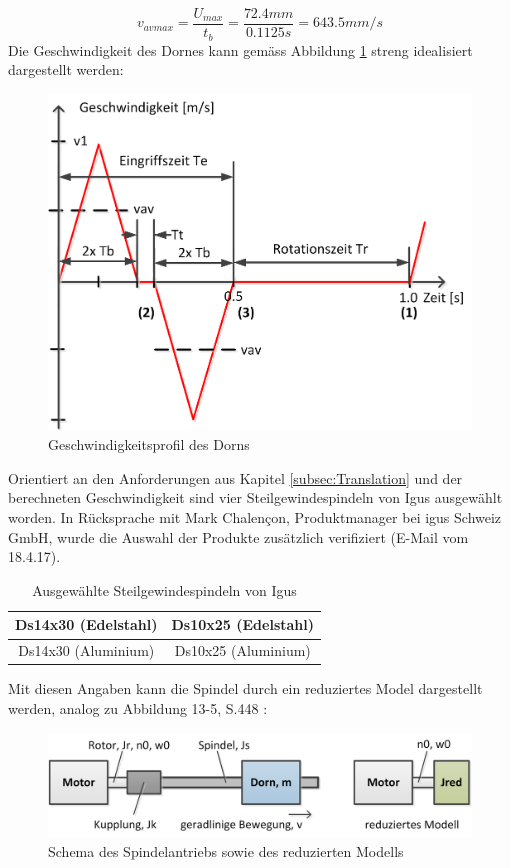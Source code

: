 \begin{equation}
v_{avmax}=\frac{U_{max}}{t_{b}}=\frac{72.4mm}{0.1125s}=643.5mm/s
\end{equation}
\newline
Die Geschwindigkeit des Dornes kann  gemäss Abbildung \ref{fig:vprofil_dorn} streng idealisiert dargestellt werden:
	\begin{figure}[H]
	\includegraphics[width=1\textwidth]{Illustrationen/6-Umsetzung/vprofil_dorn.png}
	\caption{Geschwindigkeitsprofil des Dorns}
	\label{fig:vprofil_dorn}
\end{figure}
Orientiert an den Anforderungen aus Kapitel \ref{subsec:Translation} und der berechneten Geschwindigkeit sind vier Steilgewindespindeln von Igus ausgewählt worden. In Rücksprache mit Mark Chalençon, Produktmanager bei igus Schweiz GmbH, wurde die Auswahl der Produkte zusätzlich verifiziert (E-Mail vom 18.4.17).
\begin{table}[H]
\begin{tabular}{|c|c|}
	\hline 
	Ds14x30 (Edelstahl) & Ds10x25 (Edelstahl) \\ 
	\hline 
	Ds14x30 (Aluminium) & Ds10x25 (Aluminium) \\ 
	\hline 
\end{tabular} 
\caption{Ausgewählte Steilgewindespindeln von Igus}
\label{tab:spindeln}
\end{table}
Mit diesen Angaben kann die Spindel durch ein reduziertes Model dargestellt werden, analog zu Abbildung 13-5, S.448 \cite{roloffmatek}:
 	\begin{figure}[H]
 	\includegraphics[width=1\textwidth]{Illustrationen/6-Umsetzung/red_modell.png}
 	\caption{Schema des Spindelantriebs sowie des reduzierten Modells}
 	\label{fig:red_modell}
	\end{figure}
